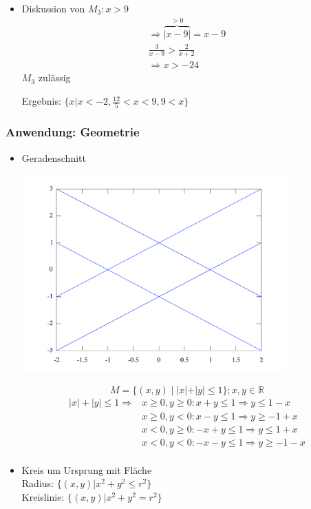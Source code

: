 \begin{example}
\begin{itemize}
 \item Diskussion von $M_3: x>9$
\begin{align*}
 \Rightarrow \overbrace{|x-9|}^{>0} = x-9 \\
\frac{3}{x-9} > \frac{2}{x+2} \\
\Rightarrow x>-24
\end{align*}
$M_3$ zulässig

Ergebnis: $\{x|x<-2, \frac{12}{5}<x<9, 9<x\}$
\end{itemize}

\end{example}

\subsubsection*{Anwendung: Geometrie}

\begin{itemize}

  \item Geradenschnitt

    \begin{center}
      \includegraphics[width=0.8\textwidth]{include/geo_betraege.pdf}
    \end{center}

    \begin{equation*}
    M = \{(x,y)\;|\; |x|+|y| \leq 1 \}; x,y \in \mathbb{R}
    \end{equation*}
    \begin{align*}
    |x|+|y| \leq 1 \Rightarrow &x \geq 0, y \geq 0: x+y \leq 1 \Rightarrow y \leq 1-x \\
            &x \geq 0, y < 0: x-y \leq 1 \Rightarrow y \geq -1+x \\
            &x < 0, y \geq 0: -x+y \leq 1 \Rightarrow y \leq 1+x \\
            &x < 0, y < 0: -x-y \leq 1 \Rightarrow y \geq -1-x \\
    \end{align*}
  
  \item
    Kreis um Ursprung mit Fläche\\
    Radius: $\{(x,y)| x^2+y^2\leq r^2 \}$\\
    Kreislinie: $\{(x,y)| x^2+y^2 = r^2 \}$
\end{itemize}
